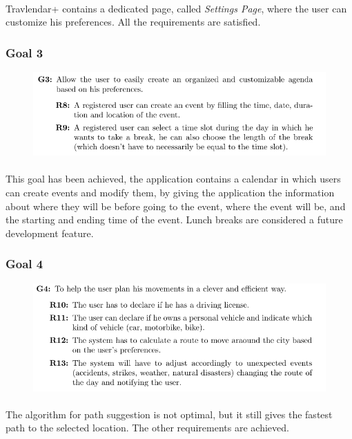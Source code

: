\documentclass{article}
\begin{document}
		\paragraph{}Travlendar+ contains a dedicated page, called \textit{Settings Page}, where the user can customize his preferences. All the requirements are satisfied.
			\subsubsection{Goal 3}
			\begin{figure}[H]
			\includegraphics[width=\linewidth]{Images/Goals/Goal_3.png}
			\label{fig:G3}
			\end{figure}
		\paragraph{}This goal has been achieved, the application contains a calendar in which users can create events and modify them, by giving the application the information about where they will be before going to the event, where the event will be, and the starting and ending time of the event. Lunch breaks are considered a future development feature.
			\subsubsection{Goal 4}
			\begin{figure}[H]
			\includegraphics[width=\linewidth]{Images/Goals/Goal_4.png}
			\label{fig:G4}
			\end{figure}
		\paragraph{}The algorithm for path suggestion is not optimal, but it still gives the fastest path to the selected location. The other requirements are achieved.
\end{document}
